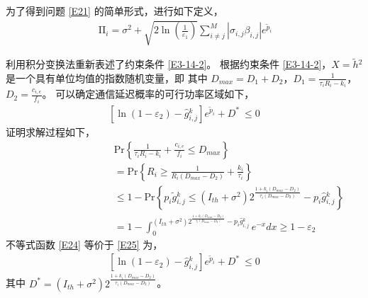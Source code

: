 为了得到问题 \eqref{E21} 的简单形式，进行如下定义，
\begin{eqnarray}\label{E22}
\ \mathrm{\Pi}_i=\sigma^2+\sqrt{2\ln\left(\frac{1}{\varepsilon_1}\right)}\sum_{i\neq j}^{M}{\left|\sigma_{i,j}\beta_{i,j}\right|e^{{\widetilde{p}}_i}}
\end{eqnarray}

利用积分变换法重新表述了约束条件 \eqref{E3-14-2}。 根据约束条件 \eqref{E3-14-2}，$X={\widetilde{h}}\phantom{}^2$ 是一个具有单位均值的指数随机变量，即 其中 $D_{max}=D_1+D_2 $，$D_1=\frac{1}{\tau_iR_i-k_i} $，$D_2=\frac{c_{i,e}}{f_i} $。 可以确定通信延迟概率的可行功率区域如下，
\begin{eqnarray}\label{E23}
\left.\left[\ln\left(1-\varepsilon_2\right)-{\hat{g}}\phantom{}_{i,j}^k\right.\right]e^{{\widetilde{p}}_i}+D^\ast\ \le0
\end{eqnarray}
证明求解过程如下，
\begin{equation}\label{E24}
\begin{array}{ll}
\qquad\qquad\qquad\qquad\quad\textrm{Pr}\left\{\frac{1}{\tau_iR_i-k_i}+\frac{c_{i,e}}{f_i}\le D_{max}\right\}\\
\qquad\qquad\qquad\qquad\quad=\textrm{Pr}\left\{R_i\geq\frac{1}{R_i\left(D_{max}-D_2\right)}+\frac{k_i}{\tau_i}\right\}\\
\qquad\qquad\qquad\qquad\quad\!\le1\!-\!\textrm{Pr}\left\{p_i{\widetilde{g}}\phantom{}_{i,j}^k\le\left(I_{th}+\sigma^2\right)2^\frac{1+k_i\left(D_{max}-D_2\right)}{\tau_i\left(D_{max}-D_2\right)}-p_i{\hat{g}}\phantom{}_{i,j}^k\right\}\\
\qquad\qquad\qquad\qquad\quad=\!1\!-\!\int_{0}^{\left(I_{th}+\sigma^2\right)2^\frac{1+k_i\left(D_{max}-D_2\right)}{\tau_i\left(D_{max}-D_2\right)}-p_i{\hat{g}}\phantom{}_{i,j}^k}{e^{-x}dx}\!\geq\!1-\varepsilon_2
\end{array}
\end{equation}
不等式函数 \eqref{E24} 等价于 \eqref{E25} 为，
\begin{eqnarray}\label{E25}
\left.\left[\ln\left(1-\varepsilon_2\right)-{\hat{g}}\phantom{}_{i,j}^k\right.\right]e^{{\widetilde{p}}_i}+D^\ast\ \le0
\end{eqnarray}
其中 $D^\ast=\left(I_{th}+\sigma^2\right)2^\frac{1+k_i\left(D_{max}-D_2\right)}{\tau_i\left(D_{max}-D_2\right)}$。


